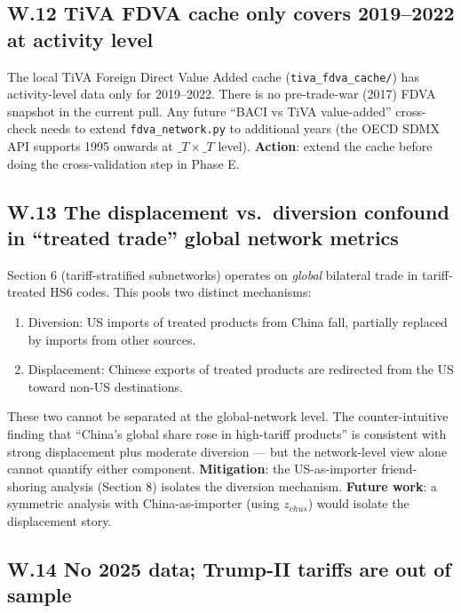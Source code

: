 \documentclass[11pt,a4paper]{article}
\begin{document}
\subsection*{W.12 TiVA FDVA cache only covers 2019--2022 at activity level}

\begin{warnbox}
The local TiVA Foreign Direct Value Added cache
(\texttt{tiva\_fdva\_cache/}) has activity-level data only for
2019--2022. There is no pre-trade-war (2017) FDVA snapshot in the
current pull. Any future ``BACI vs TiVA value-added'' cross-check
needs to extend \texttt{fdva\_network.py} to additional years (the
OECD SDMX API supports 1995 onwards at $\_T \times \_T$ level).
\textbf{Action}: extend the cache before doing the cross-validation
step in Phase E.
\end{warnbox}

\subsection*{W.13 The displacement vs.\ diversion confound in
``treated trade'' global network metrics}

\begin{warnbox}
Section 6 (tariff-stratified subnetworks) operates on \emph{global}
bilateral trade in tariff-treated HS6 codes. This pools two distinct
mechanisms:
\begin{enumerate}[leftmargin=*]
  \item Diversion: US imports of treated products from China fall,
        partially replaced by imports from other sources.
  \item Displacement: Chinese exports of treated products are
        redirected from the US toward non-US destinations.
\end{enumerate}
These two cannot be separated at the global-network level. The
counter-intuitive finding that ``China's global share rose in
high-tariff products'' is consistent with strong displacement plus
moderate diversion — but the network-level view alone cannot quantify
either component.
\textbf{Mitigation}: the US-as-importer friend-shoring analysis (Section 8)
isolates the diversion mechanism.
\textbf{Future work}: a symmetric analysis with China-as-importer
(using $z_{chus}$) would isolate the displacement story.
\end{warnbox}

\subsection*{W.14 No 2025 data; Trump-II tariffs are out of sample}
\end{document}

